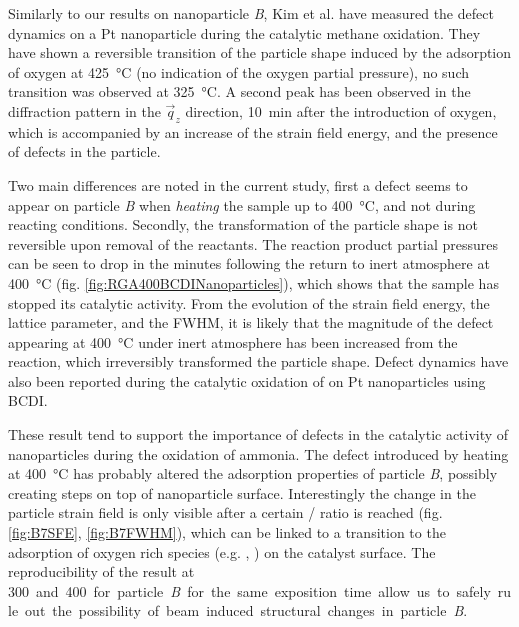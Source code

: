 Similarly to our results on nanoparticle \textit{B}, Kim et al. \parencite*{Kim2019} have measured the defect dynamics on a Pt nanoparticle during the catalytic methane oxidation.
They have shown a reversible transition of the particle shape induced by the adsorption of oxygen at \qty{425}{\degreeCelsius} (no indication of the oxygen partial pressure), no such transition was observed at \qty{325}{\degreeCelsius}.
A second peak has been observed in the diffraction pattern in the $\vec{q}_z$ direction, \qty{10}{\minute} after the introduction of oxygen, which is accompanied by an increase of the strain field energy, and the presence of defects in the particle.

Two main differences are noted in the current study, first a defect seems to appear on particle \textit{B} when \textit{heating} the sample up to \qty{400}{\degreeCelsius}, and not during reacting conditions.
Secondly, the transformation of the particle shape is not reversible upon removal of the reactants.
The reaction product partial pressures can be seen to drop in the minutes following the return to inert atmosphere at \qty{400}{\degreeCelsius} (fig. \ref{fig:RGA400BCDINanoparticles}), which shows that the sample has stopped its catalytic activity.
From the evolution of the strain field energy, the lattice parameter, and the FWHM, it is likely that the magnitude of the defect appearing at \qty{400}{\degreeCelsius} under inert atmosphere has been increased from the reaction, which irreversibly transformed the particle shape.
Defect dynamics have also been reported during the catalytic oxidation of  on Pt nanoparticles \parencite{Carnis2021b} using BCDI.

These result tend to support the importance of defects in the catalytic activity of nanoparticles during the oxidation of ammonia.
The defect introduced by heating at \qty{400}{\degreeCelsius} has probably altered the adsorption properties of particle \textit{B}, possibly creating steps on top of nanoparticle surface.
Interestingly the change in the particle strain field is only visible after a certain / ratio is reached (fig. \ref{fig:B7SFE}, \ref{fig:B7FWHM}), which can be linked to a transition to the adsorption of oxygen rich species (e.g. , ) on the catalyst surface.
The reproducibility of the result at \qty{300} and \qty{400} for particle \textit{B} for the same exposition time allow us to safely rule out the possibility of beam induced structural changes in particle \textit{B}.

